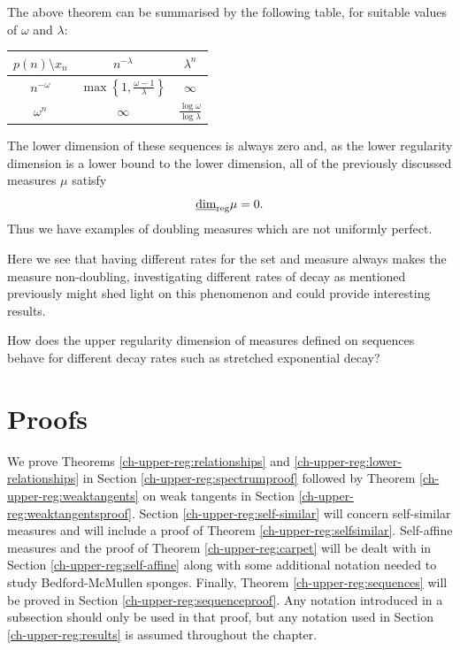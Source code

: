 The above theorem can be summarised by the following table, for suitable values of $\omega$ and $\lambda$:


\begin{table}[h]
	\centering
	\label{ch-upper-reg:sequencetable}
	\begin{tabular}{c|cc}
		$p(n) \setminus x_n$ & $n^{-\lambda}$             & $\lambda^n$                        \\ \hline
		$n^{-\omega}$       & $\max \left\{1,\frac{\omega - 1}{\lambda}\right\}$ & $\infty$\\
		$\omega^n$          & $\infty$                         & $\frac{\log \omega}{\log \lambda}$
	\end{tabular}
\end{table}

The lower dimension of these sequences is always zero and, as the lower regularity dimension is a lower bound to the lower dimension, all of the previously discussed measures $\mu$ satisfy 
\[
\underline{\dim}_{\textup{reg}} \mu = 0.
\]
Thus we have examples of doubling measures which are not uniformly perfect. 

Here we see that having different rates for the set and measure always makes the measure non-doubling, investigating different rates of decay as mentioned previously might shed light on this phenomenon and could provide interesting results.

\begin{question}
How does the upper regularity dimension of measures defined on sequences behave for different decay rates such as stretched exponential decay?
\end{question}



\section{Proofs} \label{ch-upper-reg:proof}

We prove Theorems \ref{ch-upper-reg:relationships} and \ref{ch-upper-reg:lower-relationships} in Section \ref{ch-upper-reg:spectrumproof} followed by Theorem \ref{ch-upper-reg:weaktangents} on weak tangents in Section \ref{ch-upper-reg:weaktangentsproof}. Section \ref{ch-upper-reg:self-similar} will concern self-similar measures and will include a proof of Theorem \ref{ch-upper-reg:selfsimilar}. Self-affine measures and the proof of Theorem \ref{ch-upper-reg:carpet} will be dealt with in Section \ref{ch-upper-reg:self-affine} along with some additional notation needed to study Bedford-McMullen sponges. Finally, Theorem \ref{ch-upper-reg:sequences} will be proved in Section \ref{ch-upper-reg:sequenceproof}. Any notation introduced in a subsection should only be used in that proof, but any notation used in Section \ref{ch-upper-reg:results} is assumed throughout the chapter.




